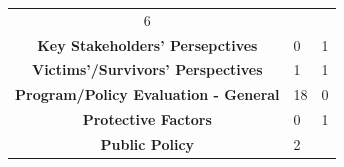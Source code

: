 \documentclass[]{tufte-handout}
\begin{document}
\begin{longtable}[]{@{}cll@{}}
\begin{minipage}[t]{0.22\columnwidth}
6\strut
\end{minipage}\tabularnewline
\begin{minipage}[t]{0.47\columnwidth}\centering\strut
\textbf{Key Stakeholders' Persepctives}\strut
\end{minipage} & \begin{minipage}[t]{0.22\columnwidth}\raggedright\strut
0\strut
\end{minipage} & \begin{minipage}[t]{0.22\columnwidth}\raggedright\strut
1\strut
\end{minipage}\tabularnewline
\begin{minipage}[t]{0.47\columnwidth}\centering\strut
\textbf{Victims'/Survivors' Perspectives}\strut
\end{minipage} & \begin{minipage}[t]{0.22\columnwidth}\raggedright\strut
1\strut
\end{minipage} & \begin{minipage}[t]{0.22\columnwidth}\raggedright\strut
1\strut
\end{minipage}\tabularnewline
\begin{minipage}[t]{0.47\columnwidth}\centering\strut
\textbf{Program/Policy Evaluation - General}\strut
\end{minipage} & \begin{minipage}[t]{0.22\columnwidth}\raggedright\strut
18\strut
\end{minipage} & \begin{minipage}[t]{0.22\columnwidth}\raggedright\strut
0\strut
\end{minipage}\tabularnewline
\begin{minipage}[t]{0.47\columnwidth}\centering\strut
\textbf{Protective Factors}\strut
\end{minipage} & \begin{minipage}[t]{0.22\columnwidth}\raggedright\strut
0\strut
\end{minipage} & \begin{minipage}[t]{0.22\columnwidth}\raggedright\strut
1\strut
\end{minipage}\tabularnewline
\begin{minipage}[t]{0.47\columnwidth}\centering\strut
\textbf{Public Policy}\strut
\end{minipage} & \begin{minipage}[t]{0.22\columnwidth}\raggedright\strut
2\strut
\end{minipage} & \begin{minipage}[t]{0.22\columnwidth}\raggedright\strut

\end{minipage}
\end{longtable}
\end{document}
